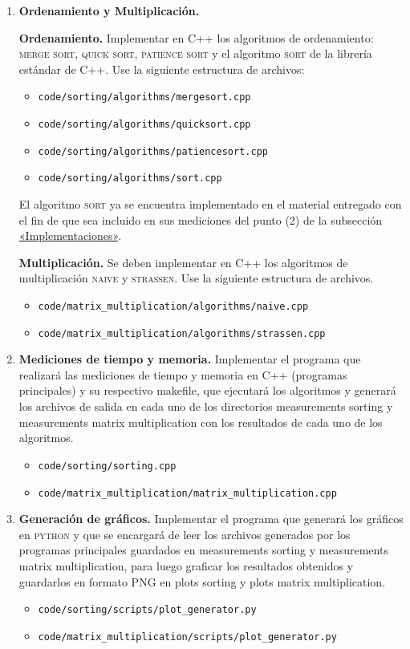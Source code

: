 \documentclass[11pt,spanish]{article}
\begin{document}
\begin{enumerate}[(1)]
  \item \textbf{Ordenamiento y Multiplicación.}

  \textbf{Ordenamiento.} Implementar en C++ los algoritmos de ordenamiento: \textsc{merge sort}, \textsc{quick sort}, \textsc{patience sort} y el algoritmo \textsc{sort} de la librería estándar de C++. Use la siguiente estructura de archivos:
  \begin{itemize}
    \item \verb|code/sorting/algorithms/mergesort.cpp|
    \item \verb|code/sorting/algorithms/quicksort.cpp|
    \item \verb|code/sorting/algorithms/patiencesort.cpp|
    \item \verb|code/sorting/algorithms/sort.cpp|
  \end{itemize}
  El algoritmo \textsc{sort} ya se encuentra implementado en el material entregado con el fin de que sea incluido en sus mediciones del punto (2) de la subsección \hyperref[subsec:implementaciones]{«Implementaciones»}.

  \textbf{Multiplicación.} Se deben implementar en C++ los algoritmos de multiplicación \textsc{naive} y \textsc{strassen}. Use la siguiente estructura de archivos.
  \begin{itemize}
    \item \verb|code/matrix_multiplication/algorithms/naive.cpp|
    \item \verb|code/matrix_multiplication/algorithms/strassen.cpp|
  \end{itemize}

  \item \textbf{Mediciones de tiempo y memoria.} Implementar el programa que realizará las mediciones de tiempo y memoria en C++ (programas principales) y su respectivo makefile, que ejecutará los algoritmos y generará los archivos de salida en cada uno de los directorios measurements sorting y measurements matrix multiplication con los resultados de cada uno de los algoritmos.
  \begin{itemize}
    \item \verb|code/sorting/sorting.cpp|
    \item \verb|code/matrix_multiplication/matrix_multiplication.cpp|
  \end{itemize}

  \item \textbf{Generación de gráficos.} Implementar el programa que generará los gráficos en \textsc{python} y que se encargará de leer los archivos generados por los programas principales guardados en measurements sorting y measurements matrix multiplication, para luego graficar los resultados obtenidos y guardarlos en formato PNG en plots sorting y plots matrix multiplication.
  \begin{itemize}
    \item \verb|code/sorting/scripts/plot_generator.py|
    \item \verb|code/matrix_multiplication/scripts/plot_generator.py|
  \end{itemize}


\end{enumerate}
\end{document}
